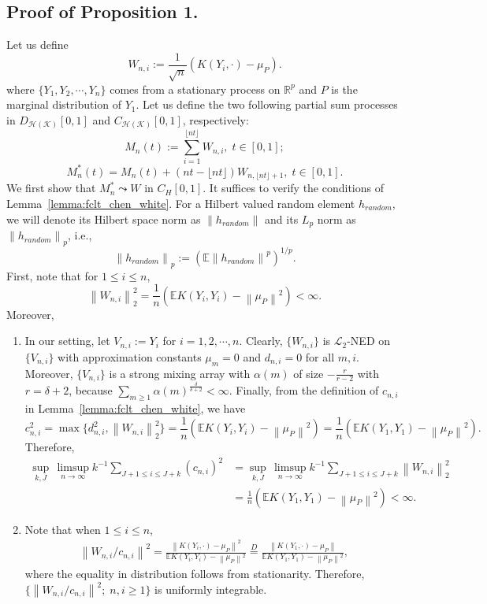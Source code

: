 \documentclass[11pt]{article}
\newcommand{\cL}{\mathcal{L}}
\newcommand{\bE}{\mathbb{E}}
\theoremstyle{plain}
\theoremstyle{definition}
\theoremstyle{remark}
\begin{document}
\begin{appendix}
\subsection{Proof of Proposition 1.}
Let us define
\[W_{n,i}:=
    \frac{1}{\sqrt{n}}(K(Y_i,\cdot)-\mu_P).\]
where $\{Y_1,Y_2,\cdots,Y_n\}$ comes from a stationary process on $\mathbb{R}^p$ and $P$ is the marginal distribution of $Y_1$. Let us define the two following partial sum processes in $D_{\mathcal{H(K)}}[0,1]$ and $C_{\mathcal{H(K)}}[0,1]$, respectively:
 \[M_n(t):=\sum_{i=1}^{\lfloor nt \rfloor} W_{n,i},\;t\in [0,1];\]
   \[M_n^*(t)=M_n(t)+(nt-\lfloor nt\rfloor)W_{n,\lfloor nt\rfloor+1},\;t\in [0,1].\]  
We first show that $M_n^*\leadsto W$ in $C_H[0,1]$. It suffices to verify the conditions of Lemma~\ref{lemma:fclt_chen_white}.  For a Hilbert valued random element $h_{random}$, we will denote its Hilbert space norm as $\left\|h_{random}\right\|$ and its $L_p$ norm as $\left\|h_{random}\right\|_p$, i.e.,
\[\left\|h_{random}\right\|_p:=(\bE \left\|h_{random}\right\|^p)^{1/p}.\]
First, note that for $1\leq i \leq n$,
\[\left\|W_{n,i}\right\|^2_2=\frac{1}{n}(\bE K(Y_i,Y_i)-\left\|\mu_P\right\|^2)<\infty.\]
 Moreover,
\begin{enumerate}
    \item [(a)]  In our setting, let $V_{n,i}:=Y_i$ for $i=1,2,\cdots,n$. Clearly, $\{W_{n,i}\}$ is $\cL_2$-NED on $\{V_{n,i}\}$ with approximation constants $\mu_m=0$ and $d_{n,i}=0$ for all $m,i$. Moreover, $\{V_{n,i}\}$ is a strong mixing array with $\alpha(m)$ of size $-\frac{r}{r-2}$ with $r=\delta+2$, because $\sum_{m\geq 1} \alpha(m)^{\frac{\delta}{\delta+2}}<\infty.$ Finally, from the definition of $c_{n,i}$ in Lemma~\ref{lemma:fclt_chen_white}, we have
    \[c^2_{n,i}=\max\{d^2_{n,i},\left\|W_{n,i}\right\|^2_2\}=\frac{1}{n}(\bE K(Y_i,Y_i)-\left\|\mu_P\right\|^2)=\frac{1}{n}(\bE K(Y_1,Y_1)-\left\|\mu_P\right\|^2).\]
    Therefore, 
    \begin{align*}
        \sup_{k,J}\,\limsup_{n\to \infty}k^{-1}\sum_{J+1\leq i \leq J+k} (c_{n,i})^2&=\sup_{k,J}\,\limsup_{n\to \infty}k^{-1}\sum_{J+1\leq i \leq J+k} \left\|W_{n,i}\right\|_2^2\\
        &= \frac{1}{n}(\bE K(Y_1,Y_1)-\left\|\mu_P\right\|^2)<\infty.
    \end{align*}
    \item[(b)] Note that when $1\leq i \leq n$,
    \begin{align*}
        \left\|W_{n,i}/c_{n,i}\right\|^2=\frac{\left\|K(Y_i,\cdot)-\mu_P\right\|^2}{\bE K(Y_i,Y_i)-\left\|\mu_P\right\|^2}\overset{D}{=}\frac{\left\|K(Y_1,\cdot)-\mu_P\right\|}{\bE K(Y_1,Y_1)-\left\|\mu_P\right\|^2},
    \end{align*}
    where the equality in distribution follows from stationarity. Therefore, \\$\{\left\|W_{n,i}/c_{n,i}\right\|^2;\;n,i\geq 1\}$ is uniformly integrable.


\end{enumerate}
\end{appendix}
\end{document}
